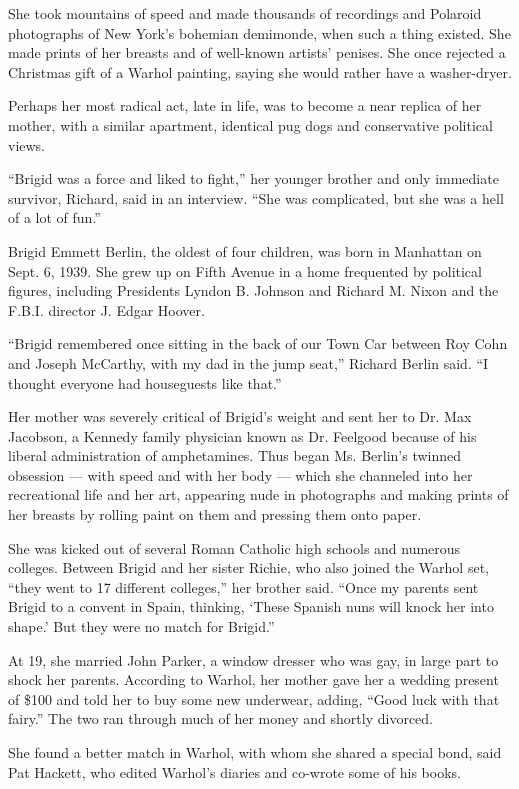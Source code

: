 She took mountains of speed and made thousands of recordings and
Polaroid photographs of New York's bohemian demimonde, when such a thing
existed. She made prints of her breasts and of well-known artists'
penises. She once rejected a Christmas gift of a Warhol painting, saying
she would rather have a washer-dryer.

Perhaps her most radical act, late in life, was to become a near replica
of her mother, with a similar apartment, identical pug dogs and
conservative political views.

``Brigid was a force and liked to fight,'' her younger brother and only
immediate survivor, Richard, said in an interview. ``She was
complicated, but she was a hell of a lot of fun.''

Brigid Emmett Berlin, the oldest of four children, was born in Manhattan
on Sept. 6, 1939. She grew up on Fifth Avenue in a home frequented by
political figures, including Presidents Lyndon B. Johnson and Richard M.
Nixon and the F.B.I. director J. Edgar Hoover.

``Brigid remembered once sitting in the back of our Town Car between Roy
Cohn and Joseph McCarthy, with my dad in the jump seat,'' Richard Berlin
said. ``I thought everyone had houseguests like that.''

Her mother was severely critical of Brigid's weight and sent her to Dr.
Max Jacobson, a Kennedy family physician known as Dr. Feelgood because
of his liberal administration of amphetamines. Thus began Ms. Berlin's
twinned obsession --- with speed and with her body --- which she
channeled into her recreational life and her art, appearing nude in
photographs and making prints of her breasts by rolling paint on them
and pressing them onto paper.

She was kicked out of several Roman Catholic high schools and numerous
colleges. Between Brigid and her sister Richie, who also joined the
Warhol set, ``they went to 17 different colleges,'' her brother said.
``Once my parents sent Brigid to a convent in Spain, thinking, `These
Spanish nuns will knock her into shape.' But they were no match for
Brigid.''

At 19, she married John Parker, a window dresser who was gay, in large
part to shock her parents. According to Warhol, her mother gave her a
wedding present of \$100 and told her to buy some new underwear, adding,
``Good luck with that fairy.'' The two ran through much of her money and
shortly divorced.

She found a better match in Warhol, with whom she shared a special bond,
said Pat Hackett, who edited Warhol's diaries and co-wrote some of his
books.

